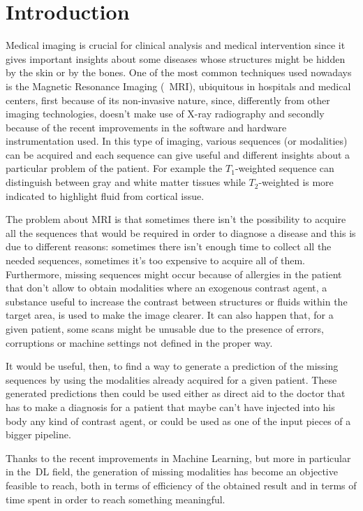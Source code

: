 \chapter{Introduction}
\label{cha:first_chapter}
Medical imaging is crucial for clinical analysis and medical intervention since it gives important insights about some diseases whose structures might be hidden by the skin or by the bones. 
One of the most common techniques used nowadays is the Magnetic Resonance Imaging (~\ac{MRI}), ubiquitous in hospitals and medical centers, first because of its non-invasive nature, since, differently from other imaging technologies, doesn't make use of X-ray radiography and secondly because of the recent improvements in the software and hardware instrumentation used.
In this type of imaging, various sequences (or modalities) can be acquired and each sequence can give useful and different insights about a particular problem of the patient. For example the $T_{1}$-weighted sequence can distinguish between gray and white matter tissues while $T_{2}$-weighted is more indicated to highlight fluid from cortical issue.

\vspace{5mm} %
The problem about MRI is that sometimes there isn't the possibility to acquire all the sequences that would be required in order to diagnose a disease and this is due to different reasons: sometimes there isn't enough time to collect all the needed sequences, sometimes it's too expensive to acquire all of them. Furthermore, missing sequences might occur because of allergies in the patient that don't allow to obtain modalities where an exogenous contrast agent, a substance useful to increase the contrast between structures or fluids within the target area, is used to make the image clearer. It can also happen that, for a given patient, some scans might be unusable due to the presence of errors, corruptions or machine settings not defined in the proper way\cite{migan}.

\vspace{5mm} %
It would be useful, then, to find a way to generate a prediction of the missing sequences by using the modalities already acquired for a given patient.
These generated predictions then could be used either as direct aid to the doctor that has to make a diagnosis for a patient that maybe can't have injected into his body any kind of contrast agent, or could be used as one of the input pieces of a bigger pipeline.

\vspace{5mm} %
Thanks to the recent improvements in Machine Learning, but more in particular in the~\ac{DL} field, the generation of missing modalities has become an objective feasible to reach, both in terms of efficiency of the obtained result and in terms of time spent in order to reach something meaningful.

